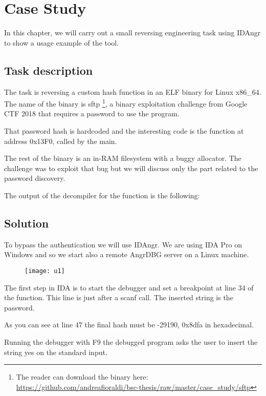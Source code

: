 \chapter{Case Study}

In this chapter, we will carry out a small reversing engineering task using IDAngr to show a usage example of the tool.

\section{Task description}

The task is reversing a custom hash function in an ELF binary for Linux x86\_64. The name of the binary is sftp \footnote{The reader can download the binary here: \url{https://github.com/andreafioraldi/bsc-thesis/raw/master/case_study/sftp}}, a binary exploitation challenge from Google CTF 2018 \cite{gctf} that requires a password to use the program. 

That password hash is hardcoded and the interesting code is the function at address 0x13F0, called by the main.

The rest of the binary is an in-RAM filesystem with a buggy allocator. The challenge was to exploit that bug but we will discuss only the part related to the password discovery.

The output of the decompiler for the function is the following:



\section{Solution}

To bypass the authentication we will use IDAngr.
We are using IDA Pro on Windows and so we start also a remote AngrDBG server on a Linux machine.

\begin{figure}[H]
  \centering
  \texttt{[image: u1]}
  \label{fig:u1}
\end{figure}

The first step in IDA is to start the debugger and set a breakpoint at line 34 of the function.
This line is just after a scanf call. The inserted string is the password.

As you can see at line 47 the final hash must be -29190, 0x8dfa in hexadecimal.

Running the debugger with F9 the debugged program asks the user to insert the string yes on the standard input.

